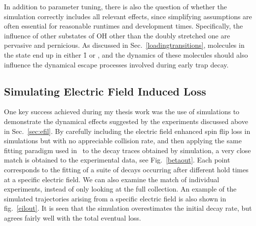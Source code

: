 
In addition to parameter tuning, there is also the question of whether the simulation correctly includes all relevant effects, since simplifying assumptions are often essential for reasonable runtimes and development times.
Specifically, the influence of other substates of OH other than the doubly stretched one are pervasive and pernicious.
As discussed in Sec.~\ref{loadingtransitions}, molecules in the  state end up in either \f1 or , and the dynamics of these molecules should also influence the dynamical escape processes involved during early trap decay.

\subsection{Simulating Electric Field Induced Loss}\label{sefil}

One key success achieved during my thesis work was the use of simulations to demonstrate the dynamical effects suggested by the experiments discussed above in Sec.~\ref{sec:efil}.
By carefully including the electric field enhanced spin flip loss in simulations but with no appreciable collision rate, and then applying the same fitting paradigm used in~\cite{Stuhl2013} to the decay traces obtained by simulation, a very close match is obtained to the experimental data, see Fig.~\ref{betaout}.
Each point corresponds to the fitting of a suite of decays occurring after different hold times at a specific electric field.
We can also examine the match of individual experiments, instead of only looking at the full collection.
An example of the simulated trajectories arising from a specific electric field is also shown in fig.~\ref{eilout}.
It is seen that the simulation overestimates the initial decay rate, but agrees fairly well with the total eventual loss.

